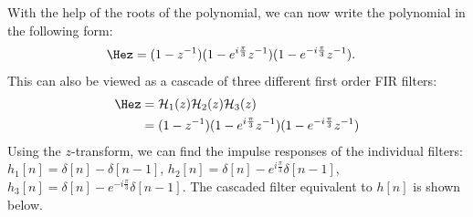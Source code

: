 With the help of the roots of the polynomial, we can now write the
polynomial in the following form:
\begin{align}
\Hez &= (1-z^{-1})(1-e^{i\frac{\pi}{3}}z^{-1})(1-e^{-i\frac{\pi}{3}}z^{-1}).
\end{align}
This can also be viewed as a cascade of three different first order FIR filters:
\begin{align}
  \Hez &= \mathcal{H}_1(z) \mathcal{H}_2(z) \mathcal{H}_3(z)\\
       &= (1-z^{-1})(1-e^{i\frac{\pi}{3}}z^{-1})(1-e^{-i\frac{\pi}{3}} z^{-1} )
\end{align}
Using the $z$-transform, we can find the impulse responses of the individual filters: $h_1[n]=\delta[n]-\delta[n-1]$, $h_2[n]=\delta[n]-e^{i\frac{\pi}{3}}\delta[n-1]$, $h_3[n]=\delta[n]-e^{-i\frac{\pi}{3}}\delta[n-1]$. 
The cascaded filter equivalent to $h[n]$ is shown below.

